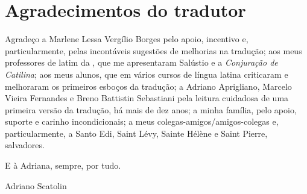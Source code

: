 \section{Agradecimentos do tradutor}

 
Agradeço a Marlene Lessa Vergílio Borges pelo apoio, incentivo e,
particularmente,  pelas  incontáveis sugestões de melhorias na tradução; aos
meus professores de latim da , que me apresentaram Salústio e a
\emph{Conjuração de Catilina}; aos meus alunos, que em vários
cursos de língua latina criticaram e melhoraram os primeiros esboços da tradução; a Adriano Aprigliano, Marcelo Vieira Fernandes e Breno Battistin Sebastiani pela leitura cuidadosa de uma primeira versão da tradução, há mais de dez anos; a
minha família, pelo apoio, suporte e carinho incondicionais; a meus colegas-amigos/amigos-colegas e, particularmente, a Santo
Edi, Saint Lévy, Sainte Hélène e Saint Pierre,  salvadores.

E à Adriana, sempre, por tudo. 

\bigskip
\hfill Adriano Scatolin 


